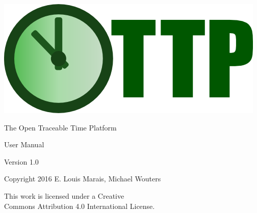 \documentclass[11pt,a4paper,openany,oneside]{book}
\begin{document}
\begin{titlepage}

\begin{center}
\centerline{\includegraphics{figures/ottplogo.png}}
\end{center}

\vspace*{4cm} 

\begin{center}
{\Huge The Open Traceable Time Platform}
\end{center}

\vspace*{4cm} 

\begin{center}
{\Huge User Manual}
\end{center}

\vspace*{4cm}

\begin{center}
Version 1.0
\end{center}

\begin{center}
Copyright 2016 E. Louis Marais, Michael Wouters
\end{center}

\end{titlepage}


\begin{titlepage}

\begin{center}
{\Large This work is licensed under a Creative \\
Commons Attribution 4.0 International License.}
\end{center}

\end{titlepage}

\tableofcontents
\listoffigures
\listoftables

\lstset{
	xleftmargin=24pt,
	basewidth=0.5em,
	basicstyle=\ttfamily,
	escapechar=\%
}
\end{document}
